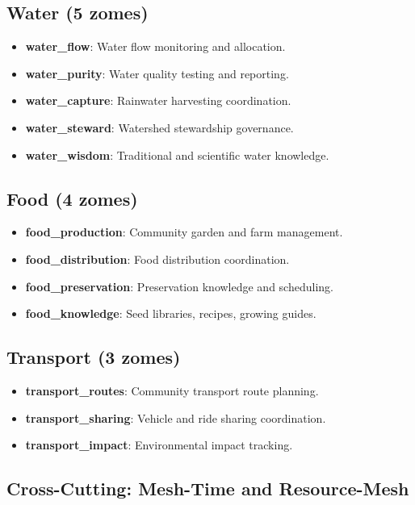 \documentclass[12pt]{book}
\begin{document}
\subsection{Water (5 zomes)}

\begin{itemize}
  \item \textbf{water\_flow}: Water flow monitoring and allocation.
  \item \textbf{water\_purity}: Water quality testing and reporting.
  \item \textbf{water\_capture}: Rainwater harvesting coordination.
  \item \textbf{water\_steward}: Watershed stewardship governance.
  \item \textbf{water\_wisdom}: Traditional and scientific water knowledge.
\end{itemize}

\subsection{Food (4 zomes)}

\begin{itemize}
  \item \textbf{food\_production}: Community garden and farm management.
  \item \textbf{food\_distribution}: Food distribution coordination.
  \item \textbf{food\_preservation}: Preservation knowledge and scheduling.
  \item \textbf{food\_knowledge}: Seed libraries, recipes, growing guides.
\end{itemize}

\subsection{Transport (3 zomes)}

\begin{itemize}
  \item \textbf{transport\_routes}: Community transport route planning.
  \item \textbf{transport\_sharing}: Vehicle and ride sharing coordination.
  \item \textbf{transport\_impact}: Environmental impact tracking.
\end{itemize}

\subsection{Cross-Cutting: Mesh-Time and Resource-Mesh}
\end{document}
